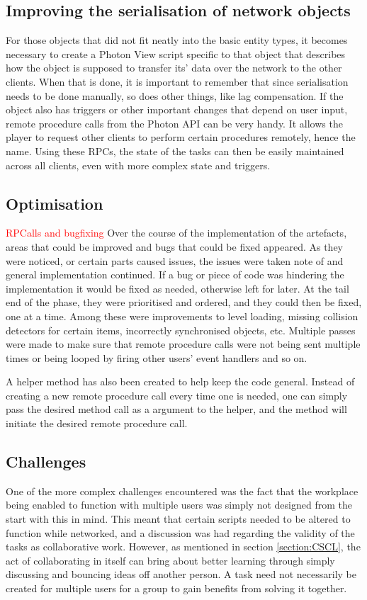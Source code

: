 \subsection{Improving the serialisation of network objects}
For those objects that did not fit neatly into the basic entity types, it becomes necessary to create a Photon View script specific to that object that describes how the object is supposed to transfer its' data over the network to the other clients. When that is done, it is important to remember that since serialisation needs to be done manually, so does other things, like lag compensation. If the object also has triggers or other important changes that depend on user input, remote procedure calls from the Photon API can be very handy. It allows the player to request other clients to perform certain procedures remotely, hence the name. Using these RPCs, the state of the tasks can then be easily maintained across all clients, even with more complex state and triggers.



\subsection{Optimisation} \label{subsec:Optimisation}
\textcolor{red}{RPCalls and bugfixing}
Over the course of the implementation of the artefacts, areas that could be improved and bugs that could be fixed appeared. As they were noticed, or certain parts caused issues, the issues were taken note of and general implementation continued. If a bug or piece of code was hindering the implementation it would be fixed as needed, otherwise left for later. At the tail end of the phase, they were prioritised and ordered, and they could then be fixed, one at a time. Among these were improvements to level loading, missing collision detectors for certain items, incorrectly synchronised objects, etc. Multiple passes were made to make sure that remote procedure calls were not being sent multiple times or being looped by firing other users' event handlers and so on. 

A helper method has also been created to help keep the code general. Instead of creating a new remote procedure call every time one is needed, one can simply pass the desired method call as a argument to the helper, and the method will initiate the desired remote procedure call. 



\subsection{Challenges}
One of the more complex challenges encountered was the fact that the workplace being enabled to function with multiple users was simply not designed from the start with this in mind. This meant that certain scripts needed to be altered to function while networked, and a discussion was had regarding the validity of the tasks as collaborative work. However, as mentioned in section \ref{section:CSCL}, the act of collaborating in itself can bring about better learning through simply discussing and bouncing ideas off another person. A task need not necessarily be created for multiple users for a group to gain benefits from solving it together.


